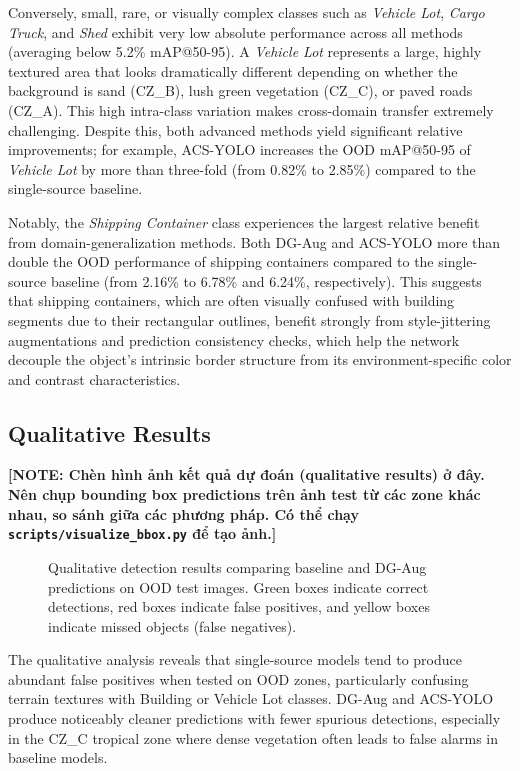 \documentclass[12pt,a4paper]{article}
\newcommand{\note}[1]{{\color{warningred}\bfseries [NOTE: #1]}}
\begin{document}
Conversely, small, rare, or visually complex classes such as \textit{Vehicle Lot}, \textit{Cargo Truck}, and \textit{Shed} exhibit very low absolute performance across all methods (averaging below 5.2\% mAP@50-95). A \textit{Vehicle Lot} represents a large, highly textured area that looks dramatically different depending on whether the background is sand (CZ\_B), lush green vegetation (CZ\_C), or paved roads (CZ\_A). This high intra-class variation makes cross-domain transfer extremely challenging. Despite this, both advanced methods yield significant relative improvements; for example, ACS-YOLO increases the OOD mAP@50-95 of \textit{Vehicle Lot} by more than three-fold (from 0.82\% to 2.85\%) compared to the single-source baseline.

Notably, the \textit{Shipping Container} class experiences the largest relative benefit from domain-generalization methods. Both DG-Aug and ACS-YOLO more than double the OOD performance of shipping containers compared to the single-source baseline (from 2.16\% to 6.78\% and 6.24\%, respectively). This suggests that shipping containers, which are often visually confused with building segments due to their rectangular outlines, benefit strongly from style-jittering augmentations and prediction consistency checks, which help the network decouple the object's intrinsic border structure from its environment-specific color and contrast characteristics.

\subsection{Qualitative Results}

\note{Chèn hình ảnh kết quả dự đoán (qualitative results) ở đây. Nên chụp bounding box predictions trên ảnh test từ các zone khác nhau, so sánh giữa các phương pháp. Có thể chạy \texttt{scripts/visualize\_bbox.py} để tạo ảnh.}

\begin{figure}[H]
\centering
\caption{Qualitative detection results comparing baseline and DG-Aug predictions on OOD test images. Green boxes indicate correct detections, red boxes indicate false positives, and yellow boxes indicate missed objects (false negatives).}
\label{fig:qualitative_results}
\end{figure}

The qualitative analysis reveals that single-source models tend to produce abundant false positives when tested on OOD zones, particularly confusing terrain textures with Building or Vehicle Lot classes. DG-Aug and ACS-YOLO produce noticeably cleaner predictions with fewer spurious detections, especially in the CZ\_C tropical zone where dense vegetation often leads to false alarms in baseline models.
\end{document}
